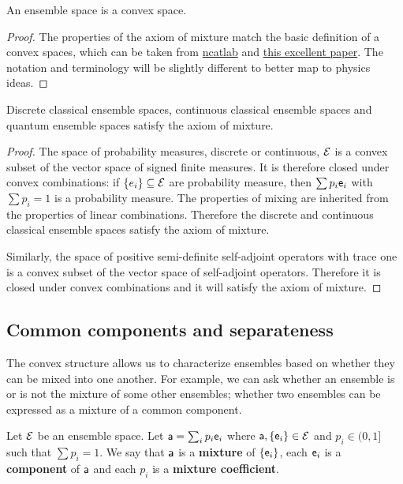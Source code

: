 \begin{coro}
	An ensemble space is a convex space.
\end{coro}

\begin{proof}
	The properties of the axiom of mixture match the basic definition of a convex spaces, which can be taken from \href{https://ncatlab.org/nlab/show/convex+space}{ncatlab} and \href{https://arxiv.org/abs/0903.5522}{this excellent paper}.  The notation and terminology will be slightly different to better map to physics ideas. 
\end{proof}

\begin{prop}
	Discrete classical ensemble spaces, continuous classical ensemble spaces and quantum ensemble spaces satisfy the axiom of mixture.
\end{prop}

\begin{proof}
	The space of probability measures, discrete or continuous, $\Ens$ is a convex subset of the vector space of signed finite measures. It is therefore closed under convex combinations: if $\{e_i\} \subseteq \Ens$ are probability measure, then $\sum p_i \ens_i$ with $\sum p_i = 1$ is a probability measure. The properties of mixing are inherited from the properties of linear combinations. Therefore the discrete and continuous classical ensemble spaces satisfy the axiom of mixture.
	
	Similarly, the space of positive semi-definite self-adjoint operators with trace one is a convex subset of the vector space of self-adjoint operators. Therefore it is closed under convex combinations and it will satisfy the axiom of mixture.
\end{proof}

\subsection{Common components and separateness}

The convex structure allows us to characterize ensembles based on whether they can be mixed into one another. For example, we can ask whether an ensemble is or is not the mixture of some other ensembles; whether two ensembles can be expressed as a mixture of a common component.

\begin{defn}
	Let $\Ens$ be an ensemble space. Let $\ens[a] = \sum_i p_i \ens_i$ where $\ens[a], \{\ens_i\} \in \Ens$ and $p_i \in (0,1]$ such that $\sum p_i = 1$. We say that $\ens[a]$ is a \textbf{mixture} of $\{\ens_i\}$, each $\ens_i$ is a \textbf{component} of $\ens[a]$ and each $p_i$ is a \textbf{mixture coefficient}.
\end{defn}

